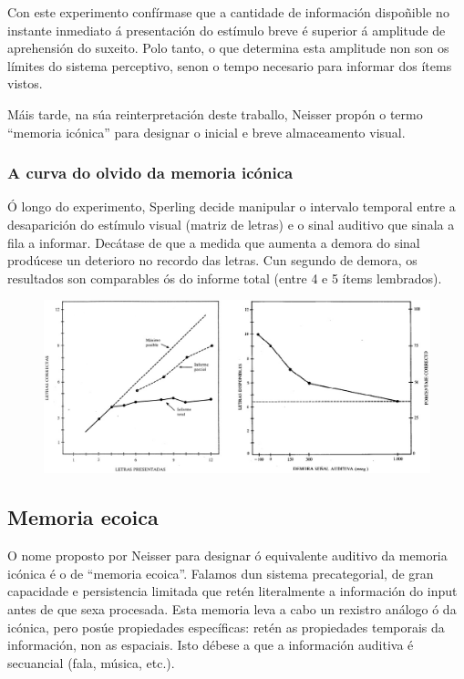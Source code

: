 \documentclass[a4paper,11pt]{article}
\begin{document}
Con este experimento confírmase que a cantidade de información dispoñible no instante inmediato á presentación do estímulo breve é superior á amplitude de aprehensión do suxeito. Polo tanto, o que determina esta amplitude non son os límites do sistema perceptivo, senon o tempo necesario para informar dos ítems vistos.

Máis tarde, na súa reinterpretación deste traballo, Neisser propón o termo ``memoria icónica'' para designar o inicial e breve almaceamento visual.


\subsubsection{A curva do olvido da memoria icónica}
Ó longo do experimento, Sperling decide manipular o intervalo temporal entre a desaparición do estímulo visual (matriz de letras) e o sinal auditivo que sinala a fila a informar. Decátase de que a medida que aumenta a demora do sinal prodúcese un deterioro no recordo das letras. Cun segundo de demora, os resultados son comparables ós do informe total (entre 4 e 5 ítems lembrados).

\begin{figure}[h!]
	\centering
	\includegraphics[width=0.98\linewidth]{memoria1_4}
\end{figure}

\subsection{Memoria ecoica}
O nome proposto por Neisser para designar ó equivalente auditivo da memoria icónica é o de ``memoria ecoica''. Falamos dun sistema precategorial, de gran capacidade e persistencia limitada que retén literalmente a información do input antes de que sexa procesada. Esta memoria leva a cabo un rexistro análogo ó da icónica, pero posúe propiedades específicas: retén as propiedades temporais da información, non as espaciais. Isto débese a que a información auditiva é secuancial (fala, música, etc.). 
\end{document}

